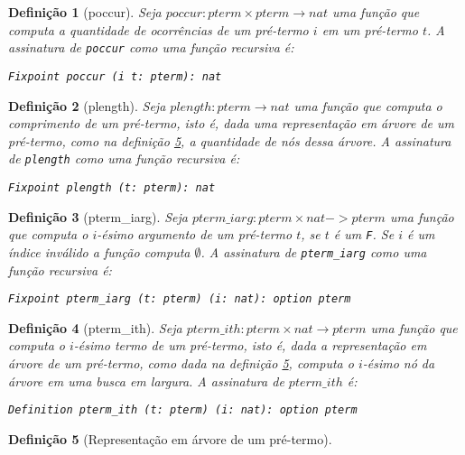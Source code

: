 \documentclass{article}
\newtheorem{definicao}{Definição}
\begin{document}
\begin{definicao}[poccur]
	Seja $poccur: pterm \times pterm \rightarrow nat$ uma função que computa a quantidade de
	ocorrências de um pré-termo $i$ em um pré-termo $t$. A assinatura de \texttt{poccur} como uma
	função recursiva é:

	\texttt{Fixpoint poccur (i t: pterm): nat}
	\label{definicao:poccur}
\end{definicao}

\begin{definicao}[plength]
	Seja $plength: pterm \rightarrow nat$ uma função que computa o comprimento de um pré-termo, isto é,
	dada uma representação em árvore de um pré-termo, como na definição
	\ref{definicao:pre-termo_arvore}, a quantidade de nós dessa árvore. A assinatura de
	\texttt{plength} como uma função recursiva é:

	\texttt{Fixpoint plength (t: pterm): nat}
	\label{definicao:plength}
\end{definicao}

\begin{definicao}[pterm\_iarg]
	Seja $pterm\_iarg: pterm \times nat -> pterm$ uma função que computa o $i$-ésimo argumento de um
	pré-termo $t$, se $t$ é um \texttt{F}. Se $i$ é um índice inválido a função computa $\emptyset$. A
	assinatura de \texttt{pterm\_iarg} como uma função recursiva é:

	\texttt{Fixpoint pterm\_iarg (t: pterm) (i: nat): option pterm}
	\label{definicao:pterm_iarg}
\end{definicao}

\begin{definicao}[pterm\_ith]
	Seja $pterm\_ith: pterm \times nat \rightarrow pterm$ uma função que computa o $i$-ésimo termo de
	um pré-termo, isto é, dada a representação em árvore de um pré-termo, como dada na definição
	\ref{definicao:pre-termo_arvore}, computa o $i$-ésimo nó da árvore em uma busca em largura. A
	assinatura de $pterm\_ith$ é: 

	\texttt{Definition pterm\_ith (t: pterm) (i: nat): option pterm}
	\label{definicao:pterm_ith}
\end{definicao}

\begin{definicao}[Representação em árvore de um pré-termo]
	\label{definicao:pre-termo_arvore}
\end{definicao}

\end{document}
